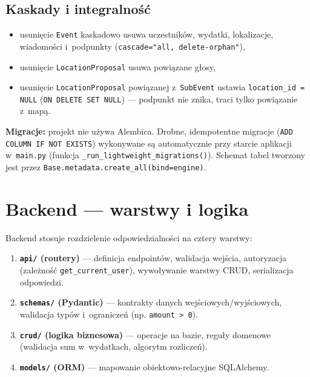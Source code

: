 \documentclass[11pt,a4paper]{article}
\begin{document}
\subsection{Kaskady i integralność}
\begin{itemize}[noitemsep]
    \item usunięcie \texttt{Event} kaskadowo usuwa uczestników, wydatki, lokalizacje,
          wiadomości i~podpunkty (\texttt{cascade="all, delete-orphan"}),
    \item usunięcie \texttt{LocationProposal} usuwa powiązane głosy,
    \item usunięcie \texttt{LocationProposal} powiązanej z~\texttt{SubEvent} ustawia
          \texttt{location\_id = NULL} (\texttt{ON DELETE SET NULL}) --- podpunkt nie znika,
          traci tylko powiązanie z~mapą.
\end{itemize}

\textbf{Migracje:} projekt nie używa Alembica. Drobne, idempotentne migracje
(\texttt{ADD COLUMN IF NOT EXISTS}) wykonywane są automatycznie przy starcie aplikacji
w~\texttt{main.py} (funkcja \texttt{\_run\_lightweight\_migrations()}). Schemat tabel tworzony
jest przez \texttt{Base.metadata.create\_all(bind=engine)}.

\section{Backend --- warstwy i logika}

Backend stosuje rozdzielenie odpowiedzialności na cztery warstwy:

\begin{enumerate}[noitemsep]
    \item \textbf{\texttt{api/} (routery)} --- definicja endpointów, walidacja wejścia,
          autoryzacja (zależność \texttt{get\_current\_user}), wywoływanie warstwy CRUD,
          serializacja odpowiedzi.
    \item \textbf{\texttt{schemas/} (Pydantic)} --- kontrakty danych wejściowych/wyjściowych,
          walidacja typów i~ograniczeń (np. \texttt{amount > 0}).
    \item \textbf{\texttt{crud/} (logika biznesowa)} --- operacje na bazie, reguły domenowe
          (walidacja sum w~wydatkach, algorytm rozliczeń).
    \item \textbf{\texttt{models/} (ORM)} --- mapowanie obiektowo-relacyjne SQLAlchemy.
\end{enumerate}
\end{document}
